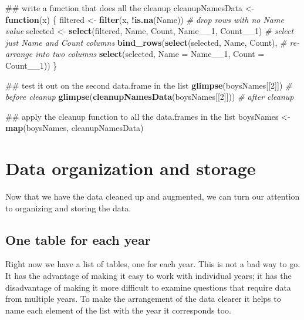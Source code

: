 \documentclass[]{book}
\newenvironment{Shaded}{\begin{snugshade}}{\end{snugshade}}
\newcommand{\KeywordTok}[1]{\textcolor[rgb]{0.13,0.29,0.53}{\textbf{#1}}}
\newcommand{\DataTypeTok}[1]{\textcolor[rgb]{0.13,0.29,0.53}{#1}}
\newcommand{\DecValTok}[1]{\textcolor[rgb]{0.00,0.00,0.81}{#1}}
\newcommand{\StringTok}[1]{\textcolor[rgb]{0.31,0.60,0.02}{#1}}
\newcommand{\CommentTok}[1]{\textcolor[rgb]{0.56,0.35,0.01}{\textit{#1}}}
\newcommand{\ControlFlowTok}[1]{\textcolor[rgb]{0.13,0.29,0.53}{\textbf{#1}}}
\newcommand{\OperatorTok}[1]{\textcolor[rgb]{0.81,0.36,0.00}{\textbf{#1}}}
\newcommand{\NormalTok}[1]{#1}
\begin{document}
\begin{Shaded}
\begin{Highlighting}[]
\NormalTok{## write a function that does all the cleanup}
\NormalTok{cleanupNamesData <-}\StringTok{ }\ControlFlowTok{function}\NormalTok{(x) \{}
\NormalTok{    filtered <-}\StringTok{ }\KeywordTok{filter}\NormalTok{(x, }\OperatorTok{!}\KeywordTok{is.na}\NormalTok{(Name)) }\CommentTok{# drop rows with no Name value}
\NormalTok{    selected <-}\StringTok{ }\KeywordTok{select}\NormalTok{(filtered, Name, Count, Name__}\DecValTok{1}\NormalTok{, Count__}\DecValTok{1}\NormalTok{) }\CommentTok{# select just Name and Count columns}
    \KeywordTok{bind_rows}\NormalTok{(}\KeywordTok{select}\NormalTok{(selected, Name,  Count), }\CommentTok{# re-arrange into two columns}
              \KeywordTok{select}\NormalTok{(selected, }\DataTypeTok{Name =}\NormalTok{ Name__}\DecValTok{1}\NormalTok{, }\DataTypeTok{Count =}\NormalTok{ Count__}\DecValTok{1}\NormalTok{))}
\NormalTok{\}}

\NormalTok{## test it out on the second data.frame in the list}
\KeywordTok{glimpse}\NormalTok{(boysNames[[}\DecValTok{2}\NormalTok{]]) }\CommentTok{# before cleanup}
\KeywordTok{glimpse}\NormalTok{(}\KeywordTok{cleanupNamesData}\NormalTok{(boysNames[[}\DecValTok{2}\NormalTok{]])) }\CommentTok{# after cleanup}

\NormalTok{## apply the cleanup function to all the data.frames in the list}
\NormalTok{boysNames <-}\StringTok{ }\KeywordTok{map}\NormalTok{(boysNames, cleanupNamesData)}
\end{Highlighting}
\end{Shaded}

\section{Data organization and
storage}\label{data-organization-and-storage}

Now that we have the data cleaned up and augmented, we can turn our
attention to organizing and storing the data.

\subsection{One table for each year}\label{one-table-for-each-year}

Right now we have a list of tables, one for each year. This is not a bad
way to go. It has the advantage of making it easy to work with
individual years; it has the disadvantage of making it more difficult to
examine questions that require data from multiple years. To make the
arrangement of the data clearer it helps to name each element of the
list with the year it corresponds too.
\end{document}
